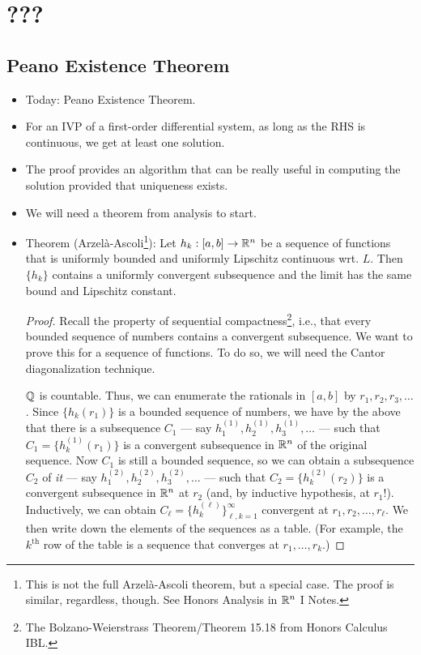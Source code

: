 \documentclass[../notes.tex]{subfiles}
\begin{document}
\chapter{???}
\section{Peano Existence Theorem}
\begin{itemize}
    \item {}Today: Peano Existence Theorem.
    \item For an IVP of a first-order differential system, as long as the RHS is continuous, we get at least one solution.
    \item The proof provides an algorithm that can be really useful in computing the solution provided that uniqueness exists.
    \item We will need a theorem from analysis to start.
    \item Theorem (Arzel\`{a}-Ascoli\footnote{This is not the full Arzel\`{a}-Ascoli theorem, but a special case. The proof is similar, regardless, though. See Honors Analysis in $\mathbb{R}^n$ I Notes.}): Let $h_k:[a,b]\to\mathbb{R}^n$ be a sequence of functions that is uniformly bounded and uniformly Lipschitz continuous wrt. $L$. Then $\{h_k\}$ contains a uniformly convergent subsequence and the limit has the same bound and Lipschitz constant.
    \begin{proof}
        Recall the property of sequential compactness\footnote{The Bolzano-Weierstrass Theorem/Theorem 15.18 from Honors Calculus IBL.}, i.e., that every bounded sequence of numbers contains a convergent subsequence. We want to prove this for a sequence of functions. To do so, we will need the Cantor diagonalization technique.\par
        $\mathbb{Q}$ is countable. Thus, we can enumerate the rationals in $[a,b]$ by $r_1,r_2,r_3,\dots$. Since $\{h_k(r_1)\}$ is a bounded sequence of numbers, we have by the above that there is a subsequence $C_1$ --- say $h_1^{(1)},h_2^{(1)},h_3^{(1)},\dots$ --- such that $C_1=\{h_k^{(1)}(r_1)\}$ is a convergent subsequence in $\mathbb{R}^n$ of the original sequence. Now $C_1$ is still a bounded sequence, so we can obtain a subsequence $C_2$ of \emph{it} --- say $h_1^{(2)},h_2^{(2)},h_3^{(2)},\dots$ --- such that $C_2=\{h_k^{(2)}(r_2)\}$ is a convergent subsequence in $\mathbb{R}^n$ at $r_2$ (and, by inductive hypothesis, at $r_1$!). Inductively, we can obtain $C_\ell=\{h_k^{(\ell)}\}_{\ell,k=1}^\infty$ convergent at $r_1,r_2,\dots,r_\ell$. We then write down the elements of the sequences as a table. (For example, the $k^\text{th}$ row of the table is a sequence that converges at $r_1,\dots,r_k$.)

\end{proof}
\end{itemize}
\end{document}
